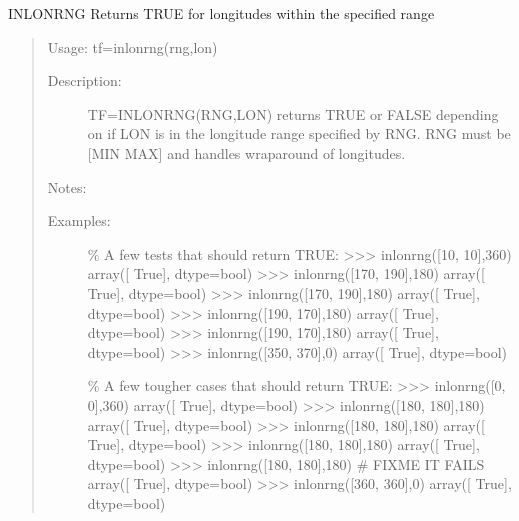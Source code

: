 \documentclass[letterpaper,10pt,english]{sphinxmanual}
\begin{document}
\begin{fulllineitems}
\label{\detokenize{infrapy.utils:infrapy.utils.latlon.inlonrng}}
INLONRNG    Returns TRUE for longitudes within the specified range
\begin{quote}

Usage:    tf=inlonrng(rng,lon)
\begin{description}
\item[{Description:}] \leavevmode
TF=INLONRNG(RNG,LON) returns TRUE or FALSE depending on if LON is in
the longitude range specified by RNG.  RNG must be {[}MIN MAX{]} and
handles wraparound of longitudes.

\end{description}

Notes:
\begin{description}
\item[{Examples:}] \leavevmode
\% A few tests that should return TRUE:
\textgreater{}\textgreater{}\textgreater{} inlonrng({[}\sphinxhyphen{}10, 10{]},360)
array({[} True{]}, dtype=bool)
\textgreater{}\textgreater{}\textgreater{} inlonrng({[}170, 190{]},\sphinxhyphen{}180)
array({[} True{]}, dtype=bool)
\textgreater{}\textgreater{}\textgreater{} inlonrng({[}170, 190{]},180)
array({[} True{]}, dtype=bool)
\textgreater{}\textgreater{}\textgreater{} inlonrng({[}\sphinxhyphen{}190, \sphinxhyphen{}170{]},\sphinxhyphen{}180)
array({[} True{]}, dtype=bool)
\textgreater{}\textgreater{}\textgreater{} inlonrng({[}\sphinxhyphen{}190, \sphinxhyphen{}170{]},180)
array({[} True{]}, dtype=bool)
\textgreater{}\textgreater{}\textgreater{} inlonrng({[}350, 370{]},0)
array({[} True{]}, dtype=bool)

\% A few tougher cases that should return TRUE:
\textgreater{}\textgreater{}\textgreater{} inlonrng({[}0, 0{]},360)
array({[} True{]}, dtype=bool)
\textgreater{}\textgreater{}\textgreater{} inlonrng({[}180, 180{]},\sphinxhyphen{}180)
array({[} True{]}, dtype=bool)
\textgreater{}\textgreater{}\textgreater{} inlonrng({[}180, 180{]},180)
array({[} True{]}, dtype=bool)
\textgreater{}\textgreater{}\textgreater{} inlonrng({[}\sphinxhyphen{}180, \sphinxhyphen{}180{]},\sphinxhyphen{}180)
array({[} True{]}, dtype=bool)
\textgreater{}\textgreater{}\textgreater{} inlonrng({[}\sphinxhyphen{}180, \sphinxhyphen{}180{]},180) \# FIXME IT FAILS
array({[} True{]}, dtype=bool)
\textgreater{}\textgreater{}\textgreater{} inlonrng({[}360, 360{]},0)
array({[} True{]}, dtype=bool)


\end{description}
\end{quote}
\end{fulllineitems}
\end{document}
